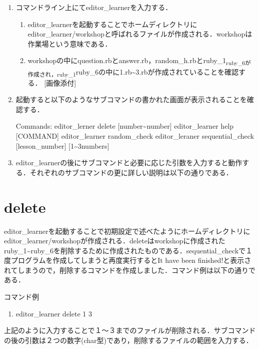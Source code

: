 \begin{enumerate}
\def\labelenumi{\arabic{enumi}.}
\item
  コマンドライン上にてeditor\_learnerを入力する．

  \begin{enumerate}
  \def\labelenumii{\arabic{enumii}.}
  \setcounter{enumii}{1}
  \tightlist
  \item
    editor\_learnerを起動することでホームディレクトリにeditor\_learner/workshopと呼ばれるファイルが作成される．workshopは作業場という意味である．
  \item
    workshopの中にquestion.rbとanswer.rb，random\_h.rbとruby\_1\textsubscript{ruby\_6が作成され，ruby\_1}ruby\_6の中に1.rb\textasciitilde{}3.rbが作成されていることを確認する．
    {[}画像添付{]}
  \end{enumerate}
\item
  起動すると以下のようなサブコマンドの書かれた画面が表示されることを確認する．

  Commands: editor\_lerner delete {[}number\textasciitilde{}number{]}
  editor\_learner help {[}COMMAND{]} editor\_learner random\_check
  editor\_leraner sequential\_check {[}lesson\_number{]}
  {[}1\textasciitilde{}3numbers{]}
\item
  editor\_learnerの後にサブコマンドと必要に応じた引数を入力すると動作する．それぞれのサブコマンドの更に詳しい説明は以下の通りである．
\end{enumerate}

    \section{delete}\label{delete}

    editor\_learnerを起動することで初期設定で述べたようにホームディレクトリにeditor\_learner/workshopが作成される．deleteはworkshopに作成されたruby\_1\textasciitilde{}ruby\_6を削除するために作成されたものである．sequential\_checkで１度プログラムを作成してしまうと再度実行するとIt
have been
finished!と表示されてしまうので，削除するコマンドを作成しました．コマンド例は以下の通りである．

コマンド例

\begin{enumerate}
\def\labelenumi{\arabic{enumi}.}
\tightlist
\item
  editor\_learner delete 1 3
\end{enumerate}

上記のように入力することで１〜３までのファイルが削除される．サブコマンドの後の引数は２つの数字(char型)であり，削除するファイルの範囲を入力する．

